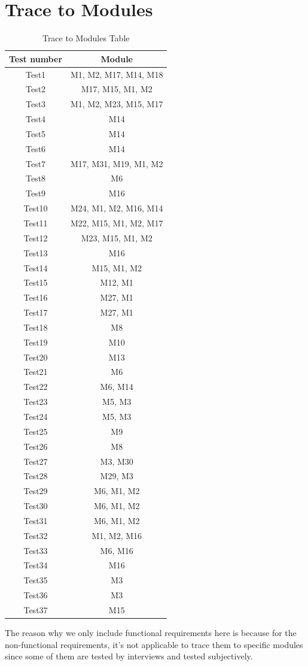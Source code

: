 \documentclass[12pt, titlepage]{article}
\begin{document}
\section{Trace to Modules}		
\begin{table}[h!]
\caption{Trace to Modules Table}
\center
\begin{tabular}{|c|c|}
\hline
Test number & Module \\
\hline
Test1 & M1, M2, M17, M14, M18 \\
\hline
Test2 & M17, M15, M1, M2 \\
\hline
Test3 & M1, M2, M23, M15, M17 \\
\hline
Test4 & M14 \\
\hline
Test5 & M14 \\
\hline
Test6 & M14 \\
\hline
Test7 & M17, M31, M19, M1, M2 \\
\hline
Test8 & M6 \\
\hline
Test9 & M16 \\
\hline
Test10 & M24, M1, M2, M16, M14 \\
\hline
Test11 & M22, M15, M1, M2, M17 \\
\hline
Test12 & M23, M15, M1, M2 \\
\hline
Test13 & M16\\
\hline
Test14 & M15, M1, M2 \\
\hline
Test15 & M12, M1 \\
\hline
Test16 & M27, M1 \\
\hline
Test17 & M27, M1 \\
\hline
Test18 & M8 \\
\hline
Test19 & M10 \\
\hline
Test20 & M13 \\
\hline
Test21 & M6 \\
\hline
Test22 & M6, M14 \\
\hline
Test23 & M5, M3 \\
\hline
Test24 & M5, M3 \\
\hline
Test25 & M9 \\
\hline
Test26 & M8\\
\hline
Test27 & M3, M30 \\
\hline
Test28 & M29, M3 \\
\hline
Test29 & M6, M1, M2 \\
\hline
Test30 & M6, M1, M2 \\
\hline
Test31 & M6, M1, M2 \\
\hline
Test32 & M1, M2, M16 \\
\hline
Test33 & M6, M16 \\
\hline
Test34 & M16 \\
\hline
Test35 & M3 \\
\hline
Test36 & M3 \\
\hline
Test37 & M15\\
\hline
\end{tabular}
\end{table}
\noindent The reason why we only include functional requirements here is because for the non-functional requirements, it's not applicable to trace them to specific modules since some of them are tested by interviews and tested subjectively.
\end{document}

